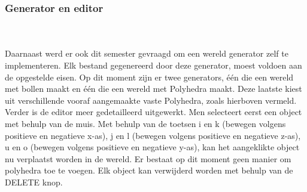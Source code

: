 \subsubsection{Generator en editor}
\\\\
Daarnaast werd er ook dit semester gevraagd om een wereld generator zelf te implementeren. Elk bestand gegenereerd door deze generator, moest voldoen aan de opgestelde eisen. Op dit moment zijn er twee generators, één die een wereld met bollen maakt en één die een wereld met Polyhedra maakt. Deze laatste kiest uit verschillende vooraf aangemaakte vaste Polyhedra, zoals hierboven vermeld.%
\\

\noindent
Verder is de editor meer gedetailleerd uitgewerkt. Men selecteert eerst een object met behulp van de muis. Met behulp van de toetsen i en k (bewegen volgens positieve en negatieve x-as), j en l (bewegen volgens positieve en negatieve z-as), u en o (bewegen volgens positieve en negatieve y-as), kan het aangeklikte object nu verplaatst worden in de wereld. Er bestaat op dit moment geen manier om polyhedra toe te voegen. Elk object kan verwijderd worden met behulp van de DELETE knop.